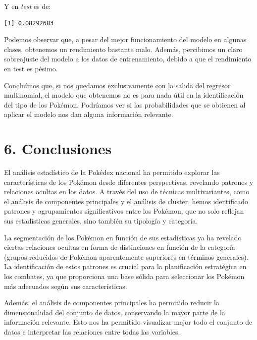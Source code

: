 \documentclass[
  12pt,
]{extreport}
\begin{document}
Y en \emph{test} es de:

\begin{verbatim}
[1] 0.08292683
\end{verbatim}

Podemos observar que, a pesar del mejor funcionamiento del modelo en
algunas clases, obtenemos un rendimiento bastante malo. Además,
percibimos un claro sobreajuste del modelo a los datos de entrenamiento,
debido a que el rendimiento en test es pésimo.

Concluímos que, si nos quedamos exclusivamente con la salida del
regresor multinomial, el modelo que obtenemos no es para nada útil en la
identificación del tipo de los Pokémon. Podríamos ver si las
probabilidades que se obtienen al aplicar el modelo nos dan alguna
información relevante.

\chapter{6. Conclusiones}\label{conclusiones-1}

El análisis estadístico de la Pokédex nacional ha permitido explorar las
características de los Pokémon desde diferentes perspectivas, revelando
patrones y relaciones ocultas en los datos. A través del uso de técnicas
multivariantes, como el análisis de componentes principales y el
análisis de cluster, hemos identificado patrones y agrupamientos
significativos entre los Pokémon, que no solo reflejan sus estadísticas
generales, sino también su tipología y categoría.

La segmentación de los Pokémon en función de sus estadísticas ya ha
revelado ciertas relaciones ocultas en forma de distinciones en función
de la categoría (grupos reducidos de Pokémon aparentemente superiores en
términos generales). La identificación de estos patrones es crucial para
la planificación estratégica en los combates, ya que proporciona una
base sólida para seleccionar los Pokémon más adecuados según sus
características.

Además, el análisis de componentes principales ha permitido reducir la
dimensionalidad del conjunto de datos, conservando la mayor parte de la
información relevante. Esto nos ha permitido visualizar mejor todo el
conjunto de datos e interpretar las relaciones entre todas las
variables.
\end{document}
